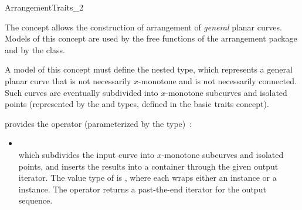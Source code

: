 
\ccRefPageBegin
\begin{ccRefConcept}{ArrangementTraits_2}

\ccDefinition
The concept \ccRefName{} allows the construction of arrangement
of {\sl general} planar curves. Models of this concept are used
by the free  functions of the arrangement package and
by the  class.

A model of this concept must define the nested  type, which
represents a general planar curve that is not necessarily $x$-monotone
and is not necessarily connected. Such curves are eventually subdivided into
$x$-monotone subcurves and isolated points (represented by the 
and  types, defined in the basic traits concept).

\ccRefines
{}

\ccTypes

\ccThreeToTwo

{provides the operator (parameterized by the  type)~:
 \begin{itemize}
 \item {}\\
 which subdivides the input curve  into $x$-monotone subcurves and
 isolated points, and inserts the results into a container through the
 given output iterator. The value type of  is
 , where each  wraps either an
  instance or a  instance. The
 operator returns a past-the-end iterator for the output sequence.
 \end{itemize}}

\ccThreeToTwo




\end{ccRefConcept}
